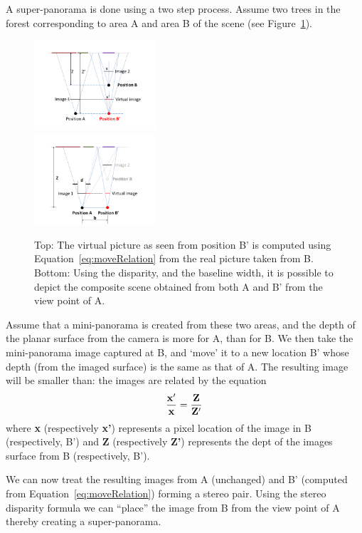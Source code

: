 \documentclass[10pt,twocolumn,letterpaper]{article}
\begin{document}
A super-panorama is done using a two step process. Assume two trees in
the forest corresponding to area A and area B of the scene (see
Figure~\ref{fig:stereo}). 
\begin{figure}[h!]
  \centering
  \includegraphics[width=0.4\textwidth]{figures/move} \\
  \includegraphics[width=0.4\textwidth]{figures/stereo} 
  \caption{ \label{fig:stereo} Top: The virtual picture as seen from position B'
    is computed using Equation~\ref{eq:moveRelation} from the real picture
    taken from B.  Bottom: Using the disparity, and the baseline width,
  it is possible to depict the composite scene obtained from both A
  and B' from the view point of A.}
\end{figure}    
Assume that a mini-panorama is created from these two areas, and the
depth of the planar surface from the camera is more for A, than for
B. We then take the mini-panorama image captured at B, and `move' it to
a new location B’ whose depth (from the imaged surface) is the same as
that of A. The resulting image  will be smaller than: the images are
related by the equation
\begin{equation}
  \label{eq:moveRelation}
  {\bf \frac{x'}{x} = \frac{Z}{Z'}}
\end{equation}
where {\bf x} (respectively {\bf x'}) represents a pixel location of
the image in B (respectively, B') and 
{\bf Z} (respectively {\bf Z'}) represents the dept of the images
surface from B (respectively, B').

We can now treat the resulting images from A (unchanged) and B’
(computed from Equation~\ref{eq:moveRelation}) forming a stereo pair.
Using the stereo disparity formula we can ``place'' the image from B from the
view point of A thereby creating a super-panorama.
\end{document}
